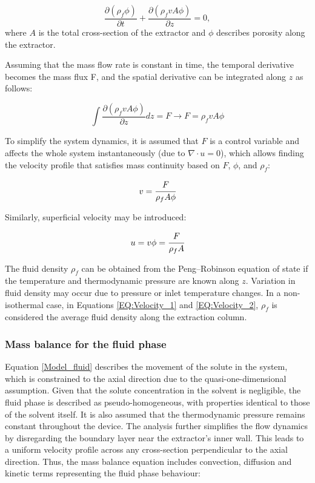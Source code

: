 \documentclass[a4paper,fleqn]{cas-dc}
\begin{document}
	{\footnotesize
		\begin{equation} \label{EQ: Continuity_differential}
			\frac{\partial (\rho_f \phi)}{\partial t} + \frac{\partial (\rho_f v A\phi)}{\partial z} = 0,
		\end{equation}
	}
	where $A$ is the total cross-section of the extractor and $\phi$ describes porosity along the extractor.
	
	Assuming that the mass flow rate is constant in time, the temporal derivative becomes the mass flux F, and the spatial derivative can be integrated along $z$ as follows:
	
	{\footnotesize
		\begin{equation}
			\int \frac{\partial (\rho_f v A \phi )}{\partial z} dz = F \rightarrow F=\rho_f v A\phi
		\end{equation}
	}
	
	To simplify the system dynamics, it is assumed that $F$ is a control variable and affects the whole system instantaneously (due to $\nabla \cdot u = 0$), which allows finding the velocity profile that satisfies mass continuity based on $F$, $\phi$, and $\rho_f$:
	
	{\footnotesize
		\begin{equation} \label{EQ:Velocity_1}
			v = \cfrac{F}{\rho_f A\phi} 
		\end{equation}
	}
	
	Similarly, superficial velocity may be introduced:
	
	{\footnotesize
		\begin{equation} \label{EQ:Velocity_2}
			u = v \phi = \cfrac{F}{\rho_f A }
		\end{equation}
	}
	
	The fluid density $\rho_f$ can be obtained from the Peng--Robinson equation of state if the temperature and thermodynamic pressure are known along $z$. Variation in fluid density may occur due to pressure or inlet temperature changes. In a non-isothermal case, in Equations \ref{EQ:Velocity_1} and \ref{EQ:Velocity_2}, $\rho_f$ is considered the average fluid density along the extraction column.
	
	\subsubsection{Mass balance for the fluid phase} \label{CH: Mass_balance_fluid}
	
	Equation \ref{Model_fluid} describes the movement of the solute in the system, which is constrained to the axial direction due to the quasi-one-dimensional assumption. Given that the solute concentration in the solvent is negligible, the fluid phase is described as pseudo-homogeneous, with properties identical to those of the solvent itself. It is also assumed that the thermodynamic pressure remains constant throughout the device. The analysis further simplifies the flow dynamics by disregarding the boundary layer near the extractor's inner wall. This leads to a uniform velocity profile across any cross-section perpendicular to the axial direction. Thus, the mass balance equation includes convection, diffusion and kinetic terms representing the fluid phase behaviour:
	
\end{document}
